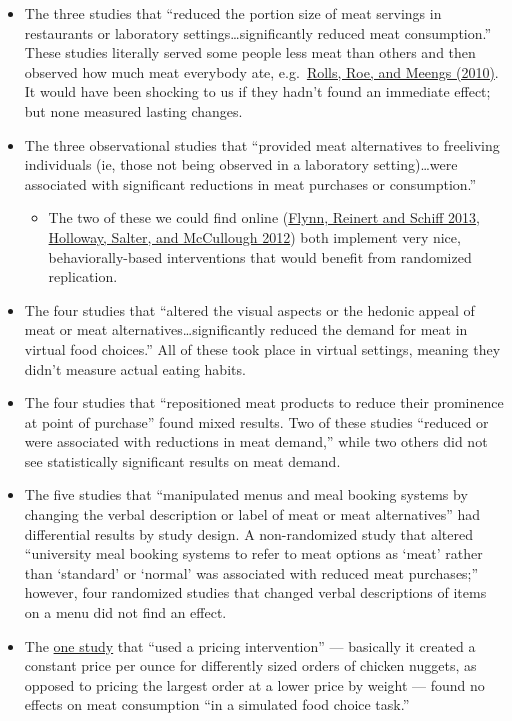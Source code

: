 \documentclass[
  letterpaper,
  DIV=11,
  numbers=noendperiod]{scrartcl}
\providecommand{\tightlist}{%
  \setlength{\itemsep}{0pt}\setlength{\parskip}{0pt}}\usepackage{longtable,booktabs,array}
\begin{document}
\begin{itemize}
\tightlist
\item
  The three studies that ``reduced the portion size of meat servings in
  restaurants or laboratory settings\ldots significantly reduced meat
  consumption.'' These studies literally served some people less meat
  than others and then observed how much meat everybody ate,
  e.g.~\href{https://www.ncbi.nlm.nih.gov/pmc/articles/PMC2844679/}{Rolls,
  Roe, and Meengs (2010)}. It would have been shocking to us if they
  hadn't found an immediate effect; but none measured lasting changes.
\item
  The three observational studies that ``provided meat alternatives to
  free­living individuals (ie, those not being observed in a laboratory
  setting)\ldots were associated with significant reductions in meat
  purchases or consumption.''

  \begin{itemize}
  \tightlist
  \item
    The two of these we could find online
    (\href{https://www.tandfonline.com/doi/abs/10.1080/19320248.2012.758066}{Flynn,
    Reinert and Schiff 2013},
    \href{https://www.cambridge.org/core/journals/proceedings-of-the-nutrition-society/article/dietary-intervention-to-reduce-meat-intake-by-50-in-university-students-a-pilot-study/23672007B72FA3D859CCF9A291F63BCF}{Holloway,
    Salter, and McCullough 2012}) both implement very nice,
    behaviorally-based interventions that would benefit from randomized
    replication.
  \end{itemize}
\item
  The four studies that ``altered the visual aspects or the hedonic
  appeal of meat or meat alternatives\ldots significantly reduced the
  demand for meat in virtual food choices.'' All of these took place in
  virtual settings, meaning they didn't measure actual eating habits.
\item
  The four studies that ``repositioned meat products to reduce their
  prominence at point of purchase'' found mixed results. Two of these
  studies ``reduced or were associated with reductions in meat demand,''
  while two others did not see statistically significant results on meat
  demand.
\item
  The five studies that ``manipulated menus and meal booking systems by
  changing the verbal description or label of meat or meat
  alternatives'' had differential results by study design. A
  non-randomized study that altered ``university meal booking systems to
  refer to meat options as `meat' rather than `standard' or `normal' was
  associated with reduced meat purchases;'' however, four randomized
  studies that changed verbal descriptions of items on a menu did not
  find an effect.
\item
  The \href{https://academic.oup.com/eurpub/article/20/1/65/609696}{one
  study} that ``used a pricing intervention'' --- basically it created a
  constant price per ounce for differently sized orders of chicken
  nuggets, as opposed to pricing the largest order at a lower price by
  weight --- found no effects on meat consumption ``in a simulated food
  choice task.''


\end{itemize}
\end{document}
